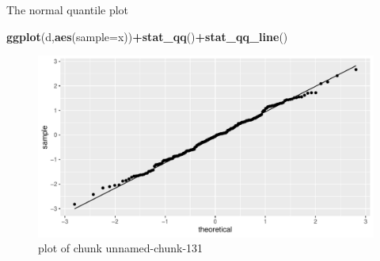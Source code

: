 \documentclass[ignorenonframetext,]{beamer}
\newenvironment{Shaded}{\begin{snugshade}}{\end{snugshade}}
\newcommand{\DataTypeTok}[1]{\textcolor[rgb]{0.13,0.29,0.53}{#1}}
\newcommand{\KeywordTok}[1]{\textcolor[rgb]{0.13,0.29,0.53}{\textbf{#1}}}
\newcommand{\NormalTok}[1]{#1}
\newcommand{\OperatorTok}[1]{\textcolor[rgb]{0.81,0.36,0.00}{\textbf{#1}}}
\begin{document}
\begin{frame}[fragile]{The normal quantile plot}
\protect\hypertarget{the-normal-quantile-plot-1}{}

\begin{Shaded}
\begin{Highlighting}[]
\KeywordTok{ggplot}\NormalTok{(d,}\KeywordTok{aes}\NormalTok{(}\DataTypeTok{sample=}\NormalTok{x))}\OperatorTok{+}\KeywordTok{stat_qq}\NormalTok{()}\OperatorTok{+}\KeywordTok{stat_qq_line}\NormalTok{()}
\end{Highlighting}
\end{Shaded}

\begin{figure}
\centering
\includegraphics{figure/unnamed-chunk-131-1.pdf}
\caption{plot of chunk unnamed-chunk-131}
\end{figure}

\end{frame}
\end{document}
